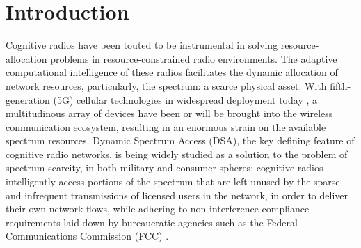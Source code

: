\documentclass[12pt, draftcls, onecolumn]{IEEEtran}
\begin{document}
\section{Introduction}\label{O}
Cognitive radios have been touted to be instrumental in solving resource-allocation problems in resource-constrained radio environments. The adaptive computational intelligence of these radios facilitates the dynamic allocation of network resources, particularly, the spectrum: a scarce physical asset. With fifth-generation (5G) cellular technologies in widespread deployment today \cite{Ericsson:5Gusecases, WSJ:5Gdominance}, a multitudinous array of devices have been or will be brought into the wireless communication ecosystem, resulting in an enormous strain on the available spectrum resources. Dynamic Spectrum Access (DSA), the key defining feature of cognitive radio networks, is being widely studied as a solution to the problem of spectrum scarcity, in both military and consumer spheres: cognitive radios intelligently access portions of the spectrum that are left unused by the sparse and infrequent transmissions of licensed users in the network, in order to deliver their own network flows, while adhering to non-interference compliance requirements laid down by bureaucratic agencies such as the Federal Communications Commission (FCC) \cite{WSJ:CBRS, WSJ:HolmanJenkinsJr.}.
\end{document}
